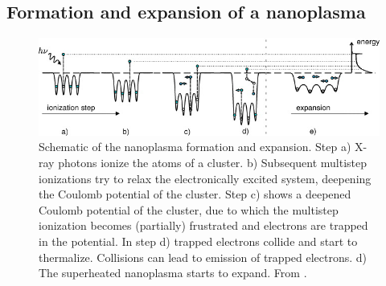 \subsection{Formation and expansion of a nanoplasma}\label{sec:nanoplasma-expansion}
\begin{figure}
	\centering
		\includegraphics[width=1.00\textwidth]{images/nano-plasma-schematic.jpg}
	\caption[Schematic of the nanoplasma formation and expansion.]{Schematic of the nanoplasma formation and expansion. Step a) X-ray photons ionize the atoms of a cluster. b) Subsequent multistep ionizations try to relax the electronically excited system, deepening the Coulomb potential of the cluster. Step c) shows a deepened Coulomb potential of the cluster, due to which the multistep ionization becomes (partially) frustrated and electrons are trapped in the potential. In step d) trapped electrons collide and start to thermalize. Collisions can lead to emission of trapped electrons. d) The superheated nanoplasma starts to expand. From \cite{Arbeiter-2011-NJP}.}
	\label{fig:nano-plasma-schematic}
\end{figure}
